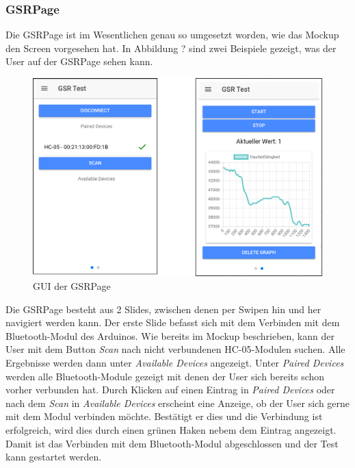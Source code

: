 \subsubsection{GSRPage}
Die GSRPage ist im Wesentlichen genau so umgesetzt worden, wie das Mockup den Screen vorgesehen hat. In Abbildung ? sind zwei Beispiele gezeigt, was der User auf der GSRPage sehen kann. \newline
\begin{figure}[h]
	\centering
	\includegraphics[width=13.5cm]{Bilder/gsrpage.png}
	\caption[GUI der HomePage]{GUI der GSRPage}
\end{figure}%
\newline
Die GSRPage besteht aus 2 Slides, zwischen denen per Swipen hin und  her navigiert werden kann. Der erste Slide befasst sich mit dem Verbinden mit dem Bluetooth-Modul des Arduinos. Wie bereits im Mockup beschrieben, kann der User mit dem Button \textit{Scan} nach nicht verbundenen HC-05-Modulen suchen. Alle Ergebnisse werden dann unter \textit{Available Devices} angezeigt. \newline Unter \textit{Paired Devices} werden alle Bluetooth-Module gezeigt mit denen der User sich bereits schon vorher verbunden hat. Durch Klicken auf einen Eintrag in \textit{Paired Devices} oder nach dem \textit{Scan} in \textit{Available Devices} erscheint eine Anzeige, ob der User sich gerne mit dem Modul verbinden möchte. Bestätigt er dies und die Verbindung ist erfolgreich, wird dies durch einen grünen Haken nebem dem Eintrag angezeigt. Damit ist das Verbinden mit dem Bluetooth-Modul abgeschlossen und der Test kann gestartet werden. \newline
